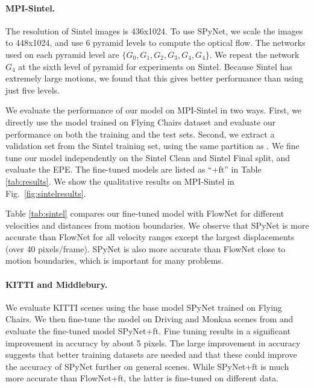 \documentclass[10pt,twocolumn,letterpaper]{article}
\begin{document}
\paragraph{MPI-Sintel.}
The resolution of Sintel images is 436x1024. 
To use SPyNet, we scale the images to 448x1024, and use 6 pyramid levels to compute the optical flow. The networks used on each pyramid level are $\{G_0, G_1, G_2, G_3, G_4, G_4\}$. We repeat the network $G_4$ at the sixth level of pyramid for experiments on Sintel. 
Because Sintel has extremely large motions, we found that this gives better performance than using just five levels.

We evaluate the performance of our model on MPI-Sintel \cite{Butler:ECCV:2012} in two ways.
First, we directly use the model trained on Flying Chairs dataset and evaluate our performance on both the training and the test sets. 
Second, we extract a validation set from the Sintel training set, using  the same partition as \cite{dosovitskiy2015flownet}. 
We fine tune our model independently on the Sintel Clean and Sintel Final split, and evaluate the EPE. 
The fine-tuned models are listed as ``+ft'' in Table \ref{tab:results}.
We show the qualitative results on MPI-Sintel in Fig.~\ref{fig:sintelresults}. 

Table \ref{tab:sintel} compares our fine-tuned model with FlowNet \cite{dosovitskiy2015flownet} for different velocities and distances from motion boundaries. 
We observe that SPyNet is more accurate than FlowNet for all velocity ranges  except the largest displacements (over 40 pixels/frame). 
SPyNet is also more accurate than FlowNet close to motion boundaries, which is important for many problems.  %

\paragraph{KITTI and Middlebury.}
We evaluate KITTI \cite{Geiger2012CVPR} scenes using the base model SPyNet trained on Flying Chairs. 
We then fine-tune the model on Driving and Monkaa scenes from \cite{sceneflowdataset} and evaluate the fine-tuned model SPyNet+ft. 
Fine tuning results in a significant improvement in accuracy by about 5 pixels.
The large improvement in accuracy suggests that better training datasets are needed and that these could improve the accuracy of SPyNet further on general scenes.
 While SPyNet+ft is much more accurate than FlowNet+ft, the latter is fine-tuned on different data.
\end{document}
